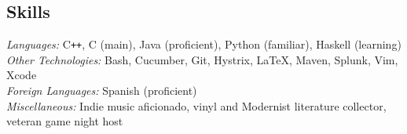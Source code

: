 \documentclass[margin,line]{resume}
\begin{document}
\begin{resume}
	\sectionbreak
	\vspace{-2.5mm}
	\section{\mysidestyle Skills}
	\emph{Languages:} C\texttt{++}, C (main), Java (proficient), Python (familiar), Haskell (learning) \\
	\emph{Other Technologies:} Bash, Cucumber, Git, Hystrix, \LaTeX, Maven, Splunk, Vim, Xcode \\
	\emph{Foreign Languages:} Spanish (proficient) \\
	\emph{Miscellaneous:}  Indie music aficionado, vinyl and Modernist literature collector, veteran game night host
	
\end{resume}
\end{document}
